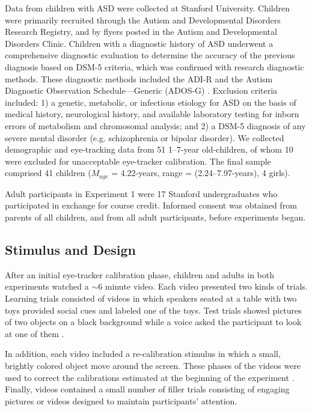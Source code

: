 \documentclass{pnastwo}
\begin{document}
\begin{article}
\begin{materials}
Data from children with ASD were collected at Stanford University. Children were primarily recruited through the Autism and Developmental Disorders Research Registry, and by flyers posted in the Autism and Developmental Disorders Clinic. Children with a diagnostic history of ASD underwent a comprehensive diagnostic evaluation to determine the accuracy of the previous diagnosis based on DSM-5 criteria, which was confirmed with research diagnostic methods. These diagnostic methods included the ADI-R \citep{lord1994,le-couter1989} and the Autism Diagnostic Observation Schedule---Generic (ADOS-G) \citep{lord1999,lord2000}. Exclusion criteria included: 1) a genetic, metabolic, or infectious etiology for ASD on the basis of medical history, neurological history, and available laboratory testing for inborn errors of metabolism and chromosomal analysis; and 2) a DSM-5 diagnosis of any severe mental disorder (e.g. schizophrenia or bipolar disorder). We collected demographic and eye-tracking data from 51 1--7-year old-children, of whom 10 were excluded for unacceptable eye-tracker calibration. The final sample comprised 41 children ({\small$M_{age}$} = 4.22-years, range = (2.24--7.97-years), 4 girls).

Adult participants in Experiment 1 were 17 Stanford undergraduates who participated in exchange for course credit. Informed consent was obtained from parents of all children, and from all adult participants, before experiments began.

\setlength{\parskip}{1em}
\subsection{Stimulus and Design} After an initial eye-tracker calibration phase, children and adults in both experiments watched a $\sim$6 minute video. Each video presented two kinds of trials. Learning trials consisted of videos in which speakers seated at a table with two toys provided social cues and labeled one of the toys. Test trials showed pictures of two objects on a black background while a voice asked the participant to look at one of them \citep[as in][]{fernald1998}.

\setlength{\parskip}{0em}

In addition, each video included a re-calibration stimulus in which a small, brightly colored object move around the screen. These phases of the videos were used to correct the calibrations estimated at the beginning of the experiment \citep[see][]{frank2012}. Finally, videos contained a small number of filler trials consisting of engaging pictures or videos designed to maintain participants' attention.


\end{materials}
\end{article}
\end{document}
